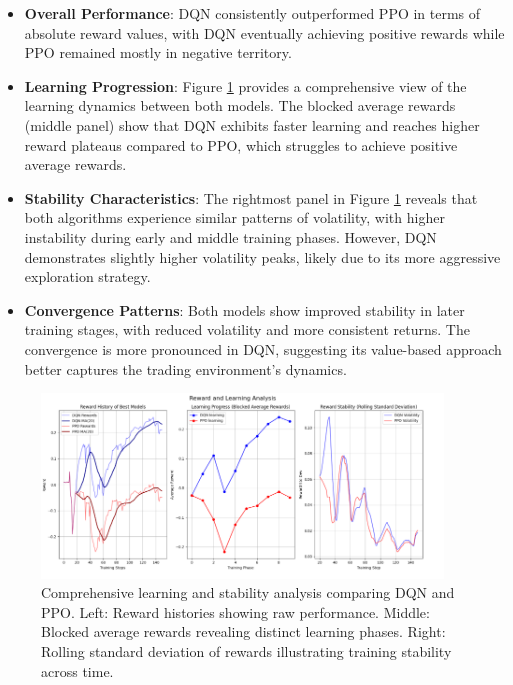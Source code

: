 \documentclass[11pt]{article}
\begin{document}
\begin{itemize}
  \item \textbf{Overall Performance}: DQN consistently outperformed PPO in terms of absolute reward values, with DQN eventually achieving positive rewards while PPO remained mostly in negative territory.
  
  \item \textbf{Learning Progression}: Figure \ref{fig:learning_analysis} provides a comprehensive view of the learning dynamics between both models. The blocked average rewards (middle panel) show that DQN exhibits faster learning and reaches higher reward plateaus compared to PPO, which struggles to achieve positive average rewards.
  
  \item \textbf{Stability Characteristics}: The rightmost panel in Figure \ref{fig:learning_analysis} reveals that both algorithms experience similar patterns of volatility, with higher instability during early and middle training phases. However, DQN demonstrates slightly higher volatility peaks, likely due to its more aggressive exploration strategy.

  \item \textbf{Convergence Patterns}: Both models show improved stability in later training stages, with reduced volatility and more consistent returns. The convergence is more pronounced in DQN, suggesting its value-based approach better captures the trading environment's dynamics.
\end{itemize}

\begin{figure}[h]
  \centering
  \includegraphics[width=0.95\textwidth]{fig/Reward and Learning Analysis.png}
  \caption{Comprehensive learning and stability analysis comparing DQN and PPO. Left: Reward histories showing raw performance. Middle: Blocked average rewards revealing distinct learning phases. Right: Rolling standard deviation of rewards illustrating training stability across time.}
  \label{fig:learning_analysis}
\end{figure}
\end{document}
